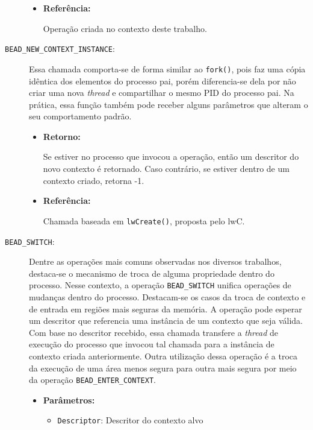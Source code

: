 \begin{description}
\begin{itemize}
    \item \textbf{Referência:}

Operação criada no contexto deste trabalho.

	\end{itemize}

  \item [\texttt{BEAD\_NEW\_CONTEXT\_INSTANCE}:]

Essa chamada comporta-se de forma similar ao \texttt{fork()}, pois
faz uma cópia idêntica dos elementos do processo pai, porém diferencia-se dela
por não criar uma nova \emph{thread} e
compartilhar o mesmo PID do processo pai. Na prática, essa função também pode
receber alguns parâmetros que alteram o seu comportamento padrão.

  \begin{itemize}
    \item \textbf{Retorno:}

Se estiver no processo que invocou a operação, então um descritor do novo
contexto é retornado. Caso contrário, se estiver dentro de um contexto criado,
retorna -1.

    \item \textbf{Referência:}

Chamada baseada em \texttt{lwCreate()}, proposta pelo lwC.

  \end{itemize}

  \item [\texttt{BEAD\_SWITCH}:]

Dentre as operações mais comuns observadas nos diversos trabalhos, destaca-se o
mecanismo de troca de alguma propriedade dentro do processo. Nesse contexto, a
operação \texttt{BEAD\_SWITCH} unifica operações de mudanças dentro do
processo. Destacam-se os casos da troca de contexto e de entrada em regiões
mais seguras da memória. A operação pode esperar um descritor que referencia uma
instância de um contexto que seja válida. Com base no descritor recebido, essa
chamada transfere a \emph{thread} de execução do processo que invocou tal chamada para
a instância de contexto criada anteriormente. Outra utilização dessa operação é
a troca da execução de uma área menos segura para outra mais segura por meio da
operação \texttt{BEAD\_ENTER\_CONTEXT}.

  \begin{itemize}
    \item \textbf{Parâmetros:} 

    \begin{itemize}
      \item \texttt{Descriptor}: Descritor do contexto alvo
    \end{itemize}


\end{itemize}
\end{description}
